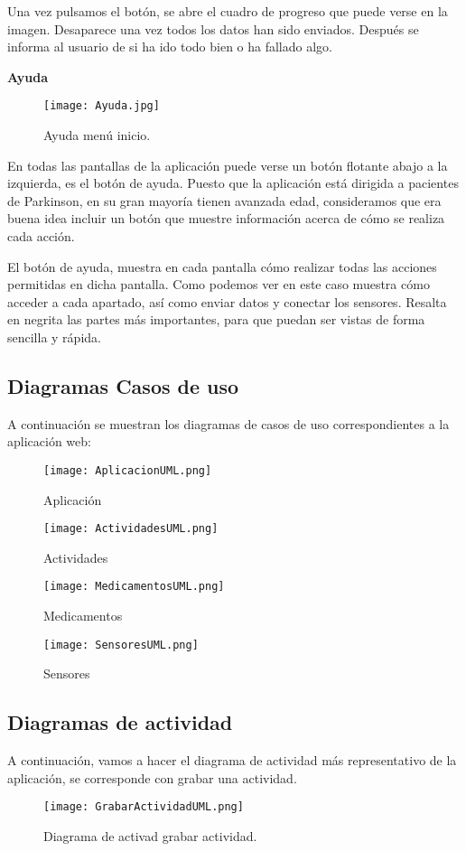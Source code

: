 \documentclass[11pt,spanish]{article}
\begin{document}
Una vez pulsamos el botón, se abre el cuadro de progreso que puede verse en la imagen. Desaparece una vez todos los datos han sido enviados. Después se informa al usuario de si ha ido todo bien o ha fallado algo.
\newline
\newpage

{\bf Ayuda}
\begin{figure}[h!]
\centering
\texttt{[image: Ayuda.jpg]}
\caption{Ayuda menú inicio.}
\end{figure}

En todas las pantallas de la aplicación puede verse un botón flotante abajo a la izquierda, es el botón de ayuda. Puesto que la aplicación está dirigida a pacientes de Parkinson, en su gran mayoría tienen avanzada edad, consideramos que era buena idea incluir un botón que muestre información acerca de cómo se realiza cada acción.
\newline

El botón de ayuda, muestra en cada pantalla cómo realizar todas las acciones permitidas en dicha pantalla. Como podemos ver en este caso muestra cómo acceder a cada apartado, así como enviar datos y conectar los sensores. Resalta en negrita las partes más importantes, para que puedan ser vistas de forma sencilla y rápida.
\newpage

\subsection{Diagramas Casos de uso}
A continuación se muestran los diagramas de casos de uso correspondientes a la aplicación web:
\newline
\begin{figure}[!htb]
  \texttt{[image: AplicacionUML.png]}
  \caption{Aplicación}
\endminipage\hfill
{}
  \texttt{[image: ActividadesUML.png]}
  \caption{Actividades}
\endminipage\hfill
\end{figure}

\begin{figure}[!htb]
%
  \texttt{[image: MedicamentosUML.png]}
  \caption{Medicamentos}
\endminipage
{}%
  \texttt{[image: SensoresUML.png]}
  \caption{Sensores}
\endminipage
\end{figure}
\newpage

\subsection{Diagramas de actividad}
A continuación, vamos a hacer el diagrama de actividad más representativo de la aplicación, se corresponde con grabar una actividad.
\begin{figure}[h!]
  \centering
  \texttt{[image: GrabarActividadUML.png]}
  \caption{Diagrama de activad grabar actividad.}
\end{figure}
\end{document}
